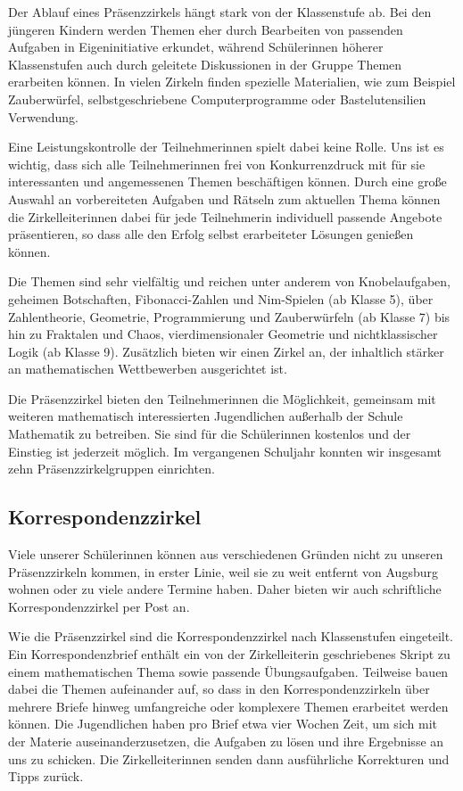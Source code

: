 \documentclass[12pt]{zettel}
\begin{document}
Der Ablauf eines Präsenzzirkels hängt stark von der Klassenstufe ab. Bei den
jüngeren Kindern werden Themen eher durch Bearbeiten von passenden
Aufgaben in Eigeninitiative erkundet, während Schülerinnen höherer
Klassenstufen auch durch geleitete Diskussionen in der Gruppe
Themen erarbeiten können. In vielen Zirkeln finden spezielle Materialien,
wie zum Beispiel Zauberwürfel, selbstgeschriebene Computerprogramme oder
Bastelutensilien Verwendung.

Eine Leistungskontrolle der Teilnehmerinnen spielt dabei keine Rolle. Uns ist es wichtig, dass sich alle Teilnehmerinnen frei von Konkurrenzdruck mit für sie interessanten
und angemessenen Themen beschäftigen können. Durch eine große Auswahl an vorbereiteten Aufgaben und Rätseln zum aktuellen Thema können die Zirkelleiterinnen dabei für
jede Teilnehmerin individuell passende Angebote präsentieren, so dass alle den Erfolg selbst erarbeiteter Lösungen genießen können.

Die Themen sind sehr vielfältig und reichen unter anderem von
Knobelaufgaben, geheimen Botschaften, Fibonacci-Zahlen und Nim-Spielen (ab Klasse 5),
über Zahlentheorie, Geometrie, Programmierung und Zauberwürfeln (ab Klasse 7) bis hin zu
Fraktalen und Chaos, vierdimensionaler Geometrie und nichtklassischer Logik
(ab Klasse 9). Zusätzlich bieten wir einen Zirkel an, der inhaltlich stärker an
mathematischen Wettbewerben ausgerichtet ist.

Die Präsenzzirkel bieten den Teilnehmerinnen die Möglichkeit,
gemeinsam mit weiteren mathematisch interessierten Jugendlichen außerhalb der
Schule Mathematik zu betreiben. Sie sind für die Schülerinnen kostenlos und der Einstieg ist jederzeit möglich. Im vergangenen Schuljahr konnten wir insgesamt zehn
Präsenzzirkelgruppen einrichten.

\subsection{Korrespondenzzirkel}

Viele unserer Schülerinnen können aus verschiedenen Gründen
nicht zu unseren Prä\-senz\-zir\-keln kommen, in erster Linie, weil sie zu weit
entfernt von Augsburg wohnen oder zu viele andere Termine haben.
Daher bieten wir auch schriftliche Korrespondenzzirkel per Post
an.

Wie die Präsenzzirkel sind die Korrespondenzzirkel nach Klassenstufen eingeteilt. Ein
Korrespondenzbrief enthält ein von der Zirkelleiterin geschriebenes Skript zu einem mathematischen Thema sowie passende
Übungsaufgaben. Teilweise bauen dabei die Themen aufeinander auf, so dass in den Korrespondenzzirkeln über mehrere Briefe hinweg umfangreiche oder komplexere Themen erarbeitet
werden können. Die Jugendlichen haben pro Brief etwa vier Wochen Zeit, um sich
mit der Materie auseinanderzusetzen, die Aufgaben zu lösen und ihre Ergebnisse
an uns zu schicken. Die Zirkelleiterinnen senden dann
ausführliche Korrekturen und Tipps zurück.
\end{document}
